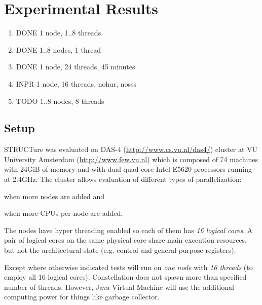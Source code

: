 \chapter{Experimental Results}
\label{chap:results}

\newcommand{\plot}[1]{
  \subfigure{
    \texttt{[image: data/all/\#1]}
  }

  \subfigure{
    \texttt{[image: data/random/\#1]}
  }

  \subfigure{
    \texttt{[image: data/nonrandom/\#1]}
  }
}

\begin{enumerate}
  \item DONE 1 node, 1..8 threads
  \item DONE 1..8 nodes, 1 thread
  \item DONE 1 node, 24 threads, 45 minutes
  \item INPR 1 node, 16 threads, nohur, nosss
  \item TODO 1..8 nodes, 8 threads
\end{enumerate}

\section{Setup}

STRUCTure was evaluated on DAS-4 (\url{http://www.cs.vu.nl/das4/})
cluster at VU University Amsterdam (\url{http://www.few.vu.nl})
which is composed of 74 machines with 24GiB of memory and with
dual quad core Intel E5620 processors running at 2.4GHz. The
cluster allows evaluation of different types of parallelization:
\begin{inparaenum}[1)]
  \item when more nodes are added and
  \item when more CPUs per node are added.
\end{inparaenum}

The nodes have hyper threading enabled so each of them has \emph{16
logical cores}. A pair of logical cores on the same physical core
share main execution resources, but not the architectural state
(e.g. control and general purpose registers).

Except where otherwise indicated tests will run on \emph{one
node} with \emph{16 threads} (to employ all 16 logical
cores). Constellation does not spawn more than specified number
of threads. However, Java Virtual Machine will use the additional
computing power for things like garbage collector.

